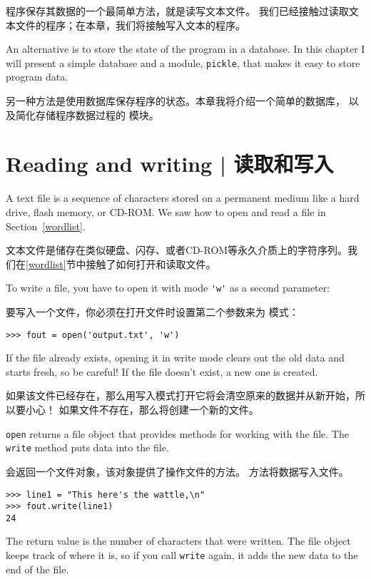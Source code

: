程序保存其数据的一个最简单方法，就是读写文本文件。
我们已经接触过读取文本文件的程序；在本章，我们将接触写入文本的程序。

An alternative is to store the state of the program in a database.
In this chapter I will present a simple database and a module,
{\tt pickle}, that makes it easy to store program data.

另一种方法是使用数据库保存程序的状态。本章我将介绍一个简单的数据库，
以及简化存储程序数据过程的  模块。
  


\section{Reading and writing  |  读取和写入}

A text file is a sequence of characters stored on a permanent
medium like a hard drive, flash memory, or CD-ROM.  We saw how
to open and read a file in Section~\ref{wordlist}.

文本文件是储存在类似硬盘、闪存、或者CD-ROM等永久介质上的字符序列。我们在\ref{wordlist}节中接触了如何打开和读取文件。
  

To write a file, you have to open it with mode \verb"'w'" as a second
parameter:

要写入一个文件，你必须在打开文件时设置第二个参数来为  模式：

\begin{lstlisting}
>>> fout = open('output.txt', 'w')
\end{lstlisting}

%
If the file already exists, opening it in write mode clears out
the old data and starts fresh, so be careful!
If the file doesn't exist, a new one is created.

如果该文件已经存在，那么用写入模式打开它将会清空原来的数据并从新开始，所以要小心！
如果文件不存在，那么将创建一个新的文件。

{\tt open} returns a file object that provides methods for working
with the file.
The {\tt write} method puts data into the file.

 会返回一个文件对象，该对象提供了操作文件的方法。  方法将数据写入文件。

\begin{lstlisting}
>>> line1 = "This here's the wattle,\n"
>>> fout.write(line1)
24
\end{lstlisting}
%
The return value is the number of characters that were written.
The file object keeps track of where it is, so if
you call {\tt write} again, it adds the new data to the end of
the file.

